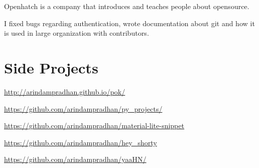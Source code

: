 \documentclass[]{deedy-resume-openfont}
\begin{document}
\begin{minipage}[t]{0.66\textwidth}
\vspace{\topsep} %
\begin{tightemize}
\item Openhatch is a company that introduces and teaches people about opensource.
\item I fixed bugs regarding authentication, wrote documentation about git and how it is used in large organization with contributors.\end{tightemize}
\sectionsep


\section{Side Projects}

{ \url{http://arindampradhan.github.io/pok/} }\\
\sectionsep

{ \url{https://github.com/arindampradhan/py_projects/} }\\
\sectionsep

{ \url{https://github.com/arindampradhan/material-lite-snippet} }\\
\sectionsep

{ \url{https://github.com/arindampradhan/hey_shorty} }\\
\sectionsep

{ \url{https://github.com/arindampradhan/yaaHN/} }\\
\sectionsep


\end{minipage}
\end{document}
